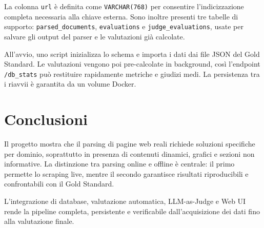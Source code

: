 \documentclass[11pt]{article}
\begin{document}
La colonna \texttt{url} è definita come \texttt{VARCHAR(768)} per consentire l'indicizzazione completa necessaria alla chiave esterna. Sono inoltre presenti tre tabelle di supporto: \texttt{parsed\_documents}, \texttt{evaluations} e \texttt{judge\_evaluations}, usate per salvare gli output del parser e le valutazioni già calcolate.

All'avvio, uno script inizializza lo schema e importa i dati dai file JSON del Gold Standard. Le valutazioni vengono poi pre-calcolate in background, così l'endpoint \texttt{/db\_stats} può restituire rapidamente metriche e giudizi medi. La persistenza tra i riavvii è garantita da un volume Docker.

\section{Conclusioni}
Il progetto mostra che il parsing di pagine web reali richiede soluzioni specifiche per dominio, soprattutto in presenza di contenuti dinamici, grafici e sezioni non informative. La distinzione tra parsing online e offline è centrale: il primo permette lo scraping live, mentre il secondo garantisce risultati riproducibili e confrontabili con il Gold Standard.

L'integrazione di database, valutazione automatica, LLM-as-Judge e Web UI rende la pipeline completa, persistente e verificabile dall'acquisizione dei dati fino alla valutazione finale.
\end{document}
